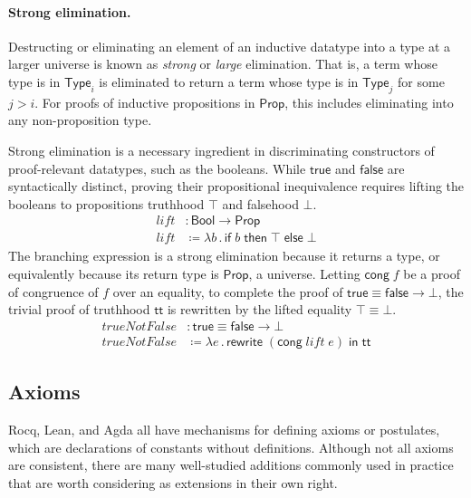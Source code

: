 \documentclass{article}
\newcommand{\kw}[1]{\mathsf{#1}}
\begin{document}
\paragraph{Strong elimination.}
Destructing or eliminating an element of an inductive datatype
into a type at a larger universe is known as \emph{strong} or \emph{large} elimination.
That is, a term whose type is in $\kw{Type}_i$
is eliminated to return a term whose type is in $\kw{Type}_j$
for some $j > i$.
For proofs of inductive propositions in $\kw{Prop}$,
this includes eliminating into any non-proposition type.

Strong elimination is a necessary ingredient in discriminating constructors
of proof-relevant datatypes, such as the booleans.
While $\kw{true}$ and $\kw{false}$ are syntactically distinct,
proving their propositional inequivalence requires lifting the booleans
to propositions truthhood $\top$ and falsehood $\bot$.
%
\begin{align*}
  \mathit{lift} &: \kw{Bool} \to \kw{Prop} \\
  \mathit{lift} &\coloneqq \lambda b \mathpunct{.} \kw{if} \; b \; \kw{then} \; \top \; \kw{else} \; \bot
\end{align*}
%
The branching expression is a strong elimination because it returns a type,
or equivalently because its return type is $\kw{Prop}$, a universe.
Letting $\kw{cong} \; f$ be a proof of congruence of $f$ over an equality,
to complete the proof of $\kw{true} \equiv \kw{false} \to \bot$,
the trivial proof of truthhood $\kw{tt}$ is rewritten by the lifted equality $\top \equiv \bot$.
%
\begin{align*}
  \mathit{trueNotFalse} &: \kw{true} \equiv \kw{false} \to \bot \\
  \mathit{trueNotFalse} &\coloneqq \lambda e \mathpunct{.} \kw{rewrite} \; (\kw{cong} \; \textit{lift} \; e) \; \kw{in} \; \kw{tt}
\end{align*}

\subsection{Axioms}

Rocq, Lean, and Agda all have mechanisms for defining axioms or postulates,
which are declarations of constants without definitions.
Although not all axioms are consistent,
there are many well-studied additions commonly used in practice
that are worth considering as extensions in their own right.
\end{document}
